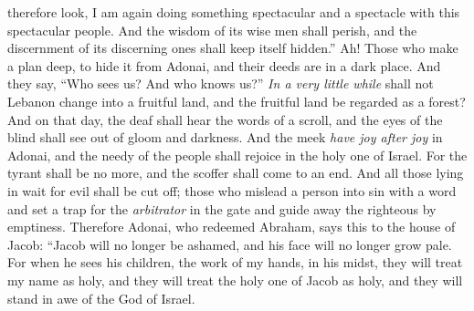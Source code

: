 \begin{biblechapter}
\verse therefore look, I am again doing something spectacular
\verse and a spectacle with this spectacular people. 
And the wisdom of its wise men shall perish, 
and the discernment of its discerning ones shall keep itself hidden.”
\verse Ah! Those who make a plan deep, to hide it from Adonai, 
and their deeds are in a dark place. 
And they say, “Who sees us? 
And who knows us?”
 \textit{In a very little while} shall not Lebanon change into a fruitful land, 
and the fruitful land be regarded as a forest?
\verse And on that day, the deaf shall hear the words of a scroll, 
and the eyes of the blind shall see out of gloom and darkness.
\verse And the meek \textit{have joy after joy} in Adonai, 
and the needy of the people shall rejoice in the holy one of Israel.
\verse For the tyrant shall be no more, 
and the scoffer shall come to an end. 
And all those lying in wait for evil shall be cut off;
\verse those who mislead a person into sin with a word 
and set a trap for the \textit{arbitrator} in the gate 
and guide away the righteous by emptiness.
\verse Therefore Adonai, who redeemed Abraham, says this to the house of Jacob:
\verse “Jacob will no longer be ashamed, 
and his face will no longer grow pale.
\verse For when he sees his children, 
the work of my hands, in his midst, 
they will treat my name as holy, 
and they will treat the holy one of Jacob as holy, 
and they will stand in awe of the God of Israel.
\end{biblechapter}


